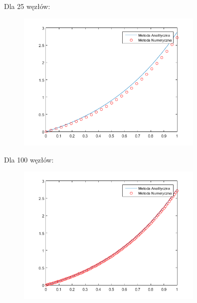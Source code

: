 \begin{samepage}
	Dla 25 węzłów:
	
	\FloatBarrier
	\begin{figure}[!ht]
		\begin{center}
			\includegraphics[width=0.8\textwidth]{Lab4/charts/zad4/a/25.png}
		\end{center}
	\end{figure}
	\FloatBarrier
\end{samepage}

\newpage

\begin{samepage}
	Dla 100 węzłów:
	
	\FloatBarrier
	\begin{figure}[!ht]
		\begin{center}
			\includegraphics[width=0.8\textwidth]{Lab4/charts/zad4/a/100.png}
		\end{center}
	\end{figure}
	\FloatBarrier
\end{samepage}

